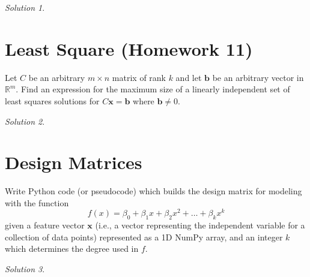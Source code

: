 \documentclass{article}
\newcommand{\vv}[1]{\mathbf{#1}}
\newcommand{\R}{\mathbb R}
\theoremstyle{remark}
\newtheorem*{solution}{Solution}
\begin{document}
\medskip

\begin{solution}
\end{solution}

\pagebreak
\section{Least Square (Homework 11)}

Let $C$ be an arbitrary $m \times n$ matrix of rank $k$ and let
$\mathbf b$ be an arbitrary vector in $\R^m$. Find an expression for
the maximum size of a linearly independent set of least squares
solutions for $C\vv x = \vv b$ where $\vv b \not = 0$.

\medskip

\begin{solution}
\end{solution}

\pagebreak
\section{Design Matrices}

Write Python code (or pseudocode) which builds the design matrix
for modeling with the function
\begin{displaymath}
  f(x) = \beta_0 + \beta_1 x + \beta_2 x^2 + \dots + \beta_k x^k
\end{displaymath}
given a feature vector $\vv x$ (i.e., a vector representing the
independent variable for a collection of data points) represented as a
1D NumPy array, and an integer $k$ which determines the degree used in
$f$.


\begin{solution}
\end{solution}
\end{document}
